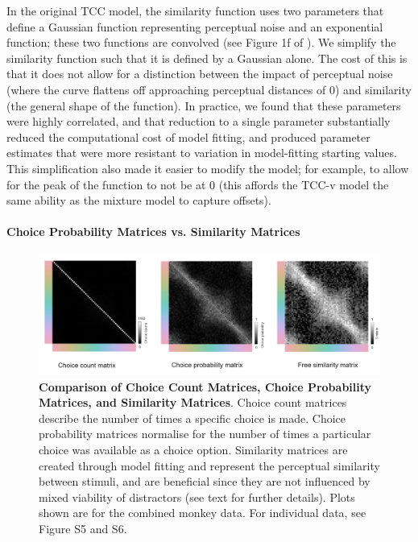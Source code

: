 \documentclass[9pt,biorxiv,lineno,onehalfspacing]{lapreprint}
\begin{document}
\begin{refsection}
In the original TCC model, the similarity function uses two parameters that define a Gaussian function representing perceptual noise and an exponential function; these two functions are convolved (see Figure 1f of \citep{schurgin_psychophysical_2020}). 
We simplify the similarity function such that it is defined by a Gaussian alone. 
The cost of this is that it does not allow for a distinction between the impact of perceptual noise (where the curve flattens off approaching perceptual distances of 0) and similarity (the general shape of the function). 
In practice, we found that these parameters were highly correlated, and that reduction to a single parameter substantially reduced the computational cost of model fitting, and produced parameter estimates that were more resistant to variation in model-fitting starting values. 
This simplification also made it easier to modify the model; for example, to allow for the peak of the function to not be at 0 (this affords the TCC-v model the same ability as the mixture model to capture offsets).

\paragraph{Choice Probability Matrices vs. Similarity Matrices}

\begin{figure}
    \begin{fullwidth}
    \centering
      \includegraphics[width=\textwidth+4cm]{Outputs/Paper/Figures/flat/F7_choiceProbVsSim.png}
           \caption{\textbf{Comparison of Choice Count Matrices, Choice Probability Matrices, and Similarity Matrices}.
           Choice count matrices describe the number of times a specific choice is made. 
           Choice probability matrices normalise for the number of times a particular choice was available as a choice option. 
           Similarity matrices are created through model fitting and represent the perceptual similarity between stimuli, and are beneficial since they are not influenced by mixed viability of distractors (see text for further details).
           Plots shown are for the combined monkey data. For individual data, see Figure S5 and S6.}
		\label{fig:choiceProbVsSim}
    \end{fullwidth}
\end{figure}


\end{refsection}
\end{document}
